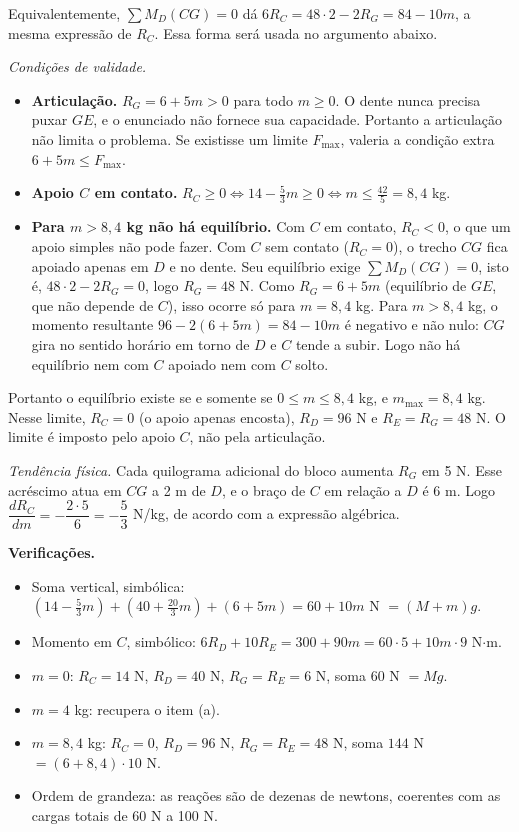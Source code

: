 \documentclass{article}%
\begin{document}
Equivalentemente, $\sum M_D(CG)=0$ dá $6R_C=48\cdot 2-2R_G=84-10m$, a mesma expressão de $R_C$. Essa forma será usada no argumento abaixo.

\emph{Condições de validade.}
\begin{itemize}
\item \textbf{Articulação.} $R_G=6+5m>0$ para todo $m\geq 0$. O dente nunca precisa puxar $GE$, e o enunciado não fornece sua capacidade. Portanto a articulação não limita o problema. Se existisse um limite $F_{\max}$, valeria a condição extra $6+5m\leq F_{\max}$.
\item \textbf{Apoio $C$ em contato.} $R_C\geq 0 \Leftrightarrow 14-\frac{5}{3}m\geq 0 \Leftrightarrow m\leq \frac{42}{5}=8{,}4$ kg.
\item \textbf{Para $m>8{,}4$ kg não há equilíbrio.} Com $C$ em contato, $R_C<0$, o que um apoio simples não pode fazer. Com $C$ sem contato ($R_C=0$), o trecho $CG$ fica apoiado apenas em $D$ e no dente. Seu equilíbrio exige $\sum M_D(CG)=0$, isto é, $48\cdot 2-2R_G=0$, logo $R_G=48$ N. Como $R_G=6+5m$ (equilíbrio de $GE$, que não depende de $C$), isso ocorre só para $m=8{,}4$ kg. Para $m>8{,}4$ kg, o momento resultante $96-2(6+5m)=84-10m$ é negativo e não nulo: $CG$ gira no sentido horário em torno de $D$ e $C$ tende a subir. Logo não há equilíbrio nem com $C$ apoiado nem com $C$ solto.
\end{itemize}

Portanto o equilíbrio existe se e somente se $0\leq m\leq 8{,}4$ kg, e $m_{\max}=8{,}4$ kg. Nesse limite, $R_C=0$ (o apoio apenas encosta), $R_D=96$ N e $R_E=R_G=48$ N. O limite é imposto pelo apoio $C$, não pela articulação.

\emph{Tendência física.} Cada quilograma adicional do bloco aumenta $R_G$ em 5 N. Esse acréscimo atua em $CG$ a 2 m de $D$, e o braço de $C$ em relação a $D$ é 6 m. Logo $\dfrac{dR_C}{dm}=-\dfrac{2\cdot 5}{6}=-\dfrac{5}{3}$ N/kg, de acordo com a expressão algébrica.

\textbf{Verificações.}
\begin{itemize}
\item Soma vertical, simbólica: $\left(14-\frac{5}{3}m\right)+\left(40+\frac{20}{3}m\right)+(6+5m)=60+10m$ N $=(M+m)g$.
\item Momento em $C$, simbólico: $6R_D+10R_E=300+90m=60\cdot 5+10m\cdot 9$ N$\cdot$m.
\item $m=0$: $R_C=14$ N, $R_D=40$ N, $R_G=R_E=6$ N, soma $60$ N $=Mg$.
\item $m=4$ kg: recupera o item (a).
\item $m=8{,}4$ kg: $R_C=0$, $R_D=96$ N, $R_G=R_E=48$ N, soma $144$ N $=(6+8{,}4)\cdot 10$ N.
\item Ordem de grandeza: as reações são de dezenas de newtons, coerentes com as cargas totais de 60 N a 100 N.
\end{itemize}
\end{document}

